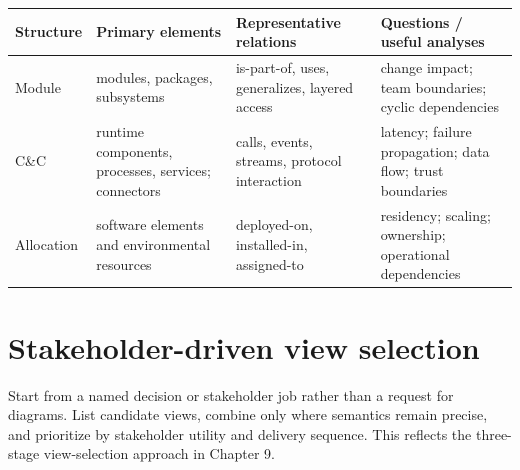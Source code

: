 \documentclass[10pt,letterpaper]{article}
\begin{document}
\small
\begin{tabularx}{\linewidth}{@{}YYYY@{}}
\toprule
\textbf{Structure} & \textbf{Primary elements} & \textbf{Representative relations} & \textbf{Questions / useful analyses} \\
\midrule
Module & modules, packages, subsystems & is-part-of, uses, generalizes, layered access & change impact; team boundaries; cyclic dependencies \\
C\&C & runtime components, processes, services; connectors & calls, events, streams, protocol interaction & latency; failure propagation; data flow; trust boundaries \\
Allocation & software elements and environmental resources & deployed-on, installed-in, assigned-to & residency; scaling; ownership; operational dependencies \\
\bottomrule
\end{tabularx}
\normalsize
\section{Stakeholder-driven view selection}
Start from a named decision or stakeholder job rather than a request for diagrams. List candidate views, combine only where semantics remain precise, and prioritize by stakeholder utility and delivery sequence. This reflects the three-stage view-selection approach in Chapter 9.
\end{document}
